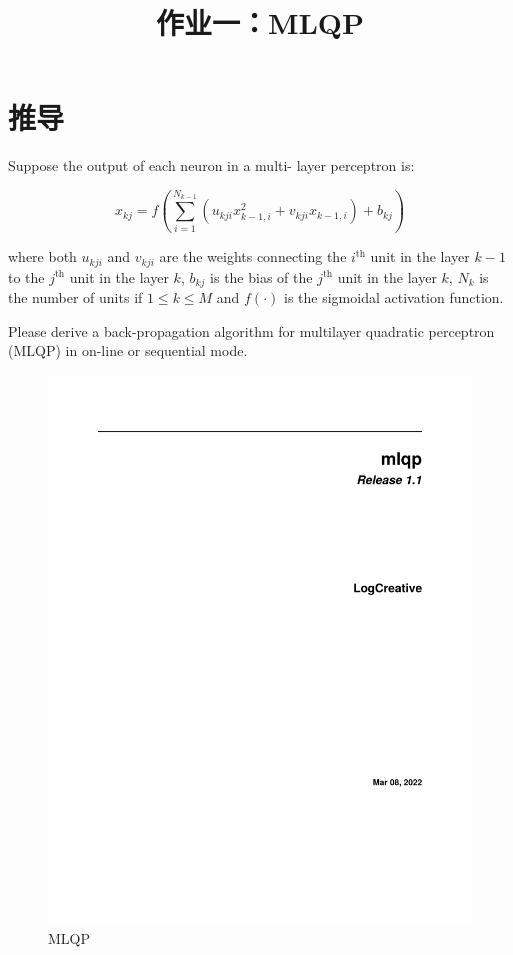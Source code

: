 
    \title{作业一：MLQP}
    \maketitle

    \section{推导}
    \begin{problem}
        Suppose the output of each neuron in a multi-
layer perceptron is:

\begin{equation}\label{eq:def}
    x_{kj} = f\left(\sum_{i=1}^{N_{k-1}}(u_{kji}x_{k-1,i}^2+v_{kji}x_{k-1,i})+b_{kj}\right)
\end{equation}

where both $u_{kji}$ and $v_{kji}$ are the weights connecting the $i^\text{th}$ unit in the layer $k-1$ to the $j^\text{th}$ unit in the layer $k$, $b_{kj}$ is 
the bias of the $j^\text{th}$ unit in the layer $k$, $N_k$ is the number of 
units  if $1\leq k\leq M$ and $f(\cdot)$ is the sigmoidal activation 
function. 

Please derive a back-propagation algorithm for multilayer 
quadratic perceptron (MLQP) in on-line or sequential 
mode.
    \end{problem}

    \begin{figure}[h]
        \centering
        \includegraphics[height=0.25\textheight]{mlqp}
        \caption{MLQP}\label{fig:mlqp}
    \end{figure}

